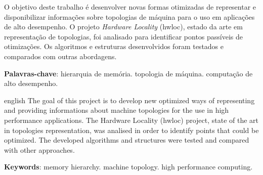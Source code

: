 
\imprimircapa
\imprimirfolhaderosto%

\begin{resumo}


	O objetivo deste trabalho é desenvolver novas formas otimizadas de representar e disponibilizar informações sobre topologias de máquina para o uso em aplicações de alto desempenho. O projeto \textit{Hardware Locality} (hwloc), estado da arte em representação de topologias, foi analisado para identificar pontos passíveis de otimizações. Os algoritmos e estruturas desenvolvidos foram testados e comparados com outras abordagens.
	
	\vspace{\onelineskip}
	
	\textbf{Palavras-chave}: hierarquia de memória. topologia de máquina. computação de alto desempenho.
\end{resumo}

\begin{resumo}[Abstract]
	\begin{otherlanguage*}{english}
		The goal of this project is to develop new optimized ways of representing and providing informations about machine topologies for the use in high performance applications.
		The Hardware Locality (hwloc) project, state of the art in topologies representation, was analised in order to identify points that could be optimized. The developed algorithms and structures were tested and compared with other approaches.
		
		\vspace{\onelineskip}
		
		\textbf{Keywords}: memory hierarchy. machine topology. high performance computing.
	\end{otherlanguage*}
\end{resumo}

